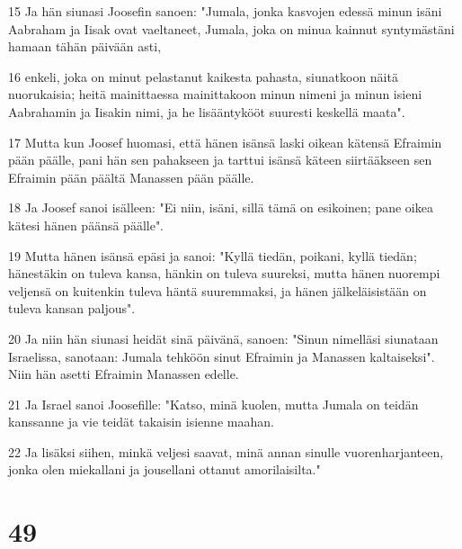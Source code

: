 \par 15 Ja hän siunasi Joosefin sanoen: "Jumala, jonka kasvojen edessä minun isäni Aabraham ja Iisak ovat vaeltaneet, Jumala, joka on minua kainnut syntymästäni hamaan tähän päivään asti,
\par 16 enkeli, joka on minut pelastanut kaikesta pahasta, siunatkoon näitä nuorukaisia; heitä mainittaessa mainittakoon minun nimeni ja minun isieni Aabrahamin ja Iisakin nimi, ja he lisääntykööt suuresti keskellä maata".
\par 17 Mutta kun Joosef huomasi, että hänen isänsä laski oikean kätensä Efraimin pään päälle, pani hän sen pahakseen ja tarttui isänsä käteen siirtääkseen sen Efraimin pään päältä Manassen pään päälle.
\par 18 Ja Joosef sanoi isälleen: "Ei niin, isäni, sillä tämä on esikoinen; pane oikea kätesi hänen päänsä päälle".
\par 19 Mutta hänen isänsä epäsi ja sanoi: "Kyllä tiedän, poikani, kyllä tiedän; hänestäkin on tuleva kansa, hänkin on tuleva suureksi, mutta hänen nuorempi veljensä on kuitenkin tuleva häntä suuremmaksi, ja hänen jälkeläisistään on tuleva kansan paljous".
\par 20 Ja niin hän siunasi heidät sinä päivänä, sanoen: "Sinun nimelläsi siunataan Israelissa, sanotaan: Jumala tehköön sinut Efraimin ja Manassen kaltaiseksi". Niin hän asetti Efraimin Manassen edelle.
\par 21 Ja Israel sanoi Joosefille: "Katso, minä kuolen, mutta Jumala on teidän kanssanne ja vie teidät takaisin isienne maahan.
\par 22 Ja lisäksi siihen, minkä veljesi saavat, minä annan sinulle vuorenharjanteen, jonka olen miekallani ja jousellani ottanut amorilaisilta."

\chapter{49}

